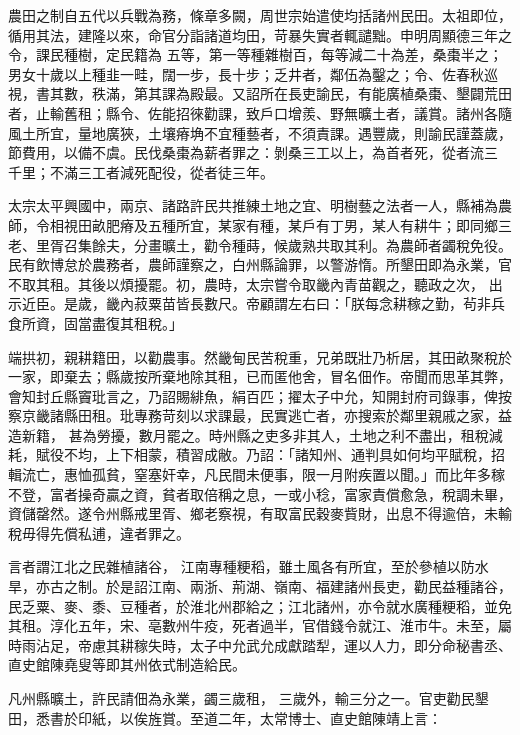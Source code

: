 \begin{pinyinscope}
 農田之制自五代以兵戰為務，條章多闕，周世宗始遣使均括諸州民田。太祖即位，循用其法，建隆以來，命官分詣諸道均田，苛暴失實者輒譴黜。申明周顯德三年之令，課民種樹，定民籍為
 五等，第一等種雜樹百，每等減二十為差，桑棗半之；男女十歲以上種韭一畦，闊一步，長十步；乏井者，鄰伍為鑿之；令、佐春秋巡視，書其數，秩滿，第其課為殿最。又詔所在長吏諭民，有能廣植桑棗、墾闢荒田者，止輸舊租；縣令、佐能招徠勸課，致戶口增羨、野無曠土者，議賞。諸州各隨風土所宜，量地廣狹，土壤瘠埆不宜種藝者，不須責課。遇豐歲，則諭民謹蓋歲，節費用，以備不虞。民伐桑棗為薪者罪之：剝桑三工以上，為首者死，從者流三
 千里；不滿三工者減死配役，從者徒三年。



 太宗太平興國中，兩京、諸路許民共推練土地之宜、明樹藝之法者一人，縣補為農師，令相視田畝肥瘠及五種所宜，某家有種，某戶有丁男，某人有耕牛；即同鄉三老、里胥召集餘夫，分畫曠土，勸令種蒔，候歲熟共取其利。為農師者蠲稅免役。民有飲博怠於農務者，農師謹察之，白州縣論罪，以警游惰。所墾田即為永業，官不取其租。其後以煩擾罷。初，農時，太宗嘗令取畿內青苗觀之，聽政之次，
 出示近臣。是歲，畿內菽粟苗皆長數尺。帝顧謂左右曰：「朕每念耕稼之勤，茍非兵食所資，固當盡復其租稅。」



 端拱初，親耕籍田，以勸農事。然畿甸民苦稅重，兄弟既壯乃析居，其田畝聚稅於一家，即棄去；縣歲按所棄地除其租，已而匿他舍，冒名佃作。帝聞而思革其弊，會知封丘縣竇玭言之，乃詔賜緋魚，絹百匹；擢太子中允，知開封府司錄事，俾按察京畿諸縣田租。玭專務苛刻以求課最，民實逃亡者，亦搜索於鄰里親戚之家，益造新籍，
 甚為勞擾，數月罷之。時州縣之吏多非其人，土地之利不盡出，租稅減耗，賦役不均，上下相蒙，積習成敝。乃詔：「諸知州、通判具如何均平賦稅，招輯流亡，惠恤孤貧，窒塞奸幸，凡民間未便事，限一月附疾置以聞。」而比年多稼不登，富者操奇贏之資，貧者取倍稱之息，一或小稔，富家責償愈急，稅調未畢，資儲罄然。遂令州縣戒里胥、鄉老察視，有取富民穀麥貲財，出息不得逾倍，未輸稅毋得先償私逋，違者罪之。



 言者謂江北之民雜植諸谷，
 江南專種粳稻，雖土風各有所宜，至於參植以防水旱，亦古之制。於是詔江南、兩浙、荊湖、嶺南、福建諸州長吏，勸民益種諸谷，民乏粟、麥、黍、豆種者，於淮北州郡給之；江北諸州，亦令就水廣種粳稻，並免其租。淳化五年，宋、亳數州牛疫，死者過半，官借錢令就江、淮市牛。未至，屬時雨沾足，帝慮其耕稼失時，太子中允武允成獻踏犁，運以人力，即分命秘書丞、直史館陳堯叟等即其州依式制造給民。



 凡州縣曠土，許民請佃為永業，蠲三歲租，
 三歲外，輸三分之一。官吏勸民墾田，悉書於印紙，以俟旌賞。至道二年，太常博士、直史館陳靖上言：




\end{pinyinscope}
